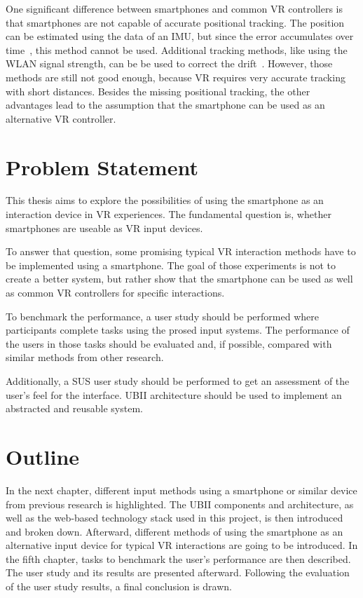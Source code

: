 One significant difference between smartphones and common \ac{VR} controllers is that smartphones are not capable of accurate positional tracking. The position can be estimated using the data of an \ac{IMU}, but since the error accumulates over time~\cite[44]{Steed.2013}, this method cannot be used. Additional tracking methods, like using the \ac{WLAN} signal strength, can be be used to correct the drift~\cite{Zhang.2015}. However, those methods are still not good enough, because \ac{VR} requires very accurate tracking with short distances.
Besides the missing positional tracking, the other advantages lead to the assumption that the smartphone can be used as an alternative \ac{VR} controller.


\section{Problem Statement}\label{section:problem-statement}
This thesis aims to explore the possibilities of using the smartphone as an interaction device in \ac{VR} experiences. The fundamental question is, whether smartphones are useable as \ac{VR} input devices.

To answer that question, some promising typical \ac{VR} interaction methods have to be implemented using a smartphone. The goal of those experiments is not to create a better system, but rather show that the smartphone can be used as well as common \ac{VR} controllers for specific interactions.

To benchmark the performance, a user study should be performed where participants complete tasks using the prosed input systems.
The performance of the users in those tasks should be evaluated and, if possible, compared with similar methods from other research.

Additionally, a \ac{SUS} user study should be performed to get an assessment of the user's feel for the interface.
\ac{UBII} architecture should be used to implement an abstracted and reusable system.


\section{Outline}\label{section:outline}
In the next chapter, different input methods using a smartphone or similar device from previous research is highlighted. The \ac{UBII} components and architecture, as well as the web-based technology stack used in this project, is then introduced and broken down. Afterward, different methods of using the smartphone as an alternative input device for typical \ac{VR} interactions are going to be introduced. In the fifth chapter, tasks to benchmark the user's performance are then described. The user study and its results are presented afterward. Following the evaluation of the user study results, a final conclusion is drawn.